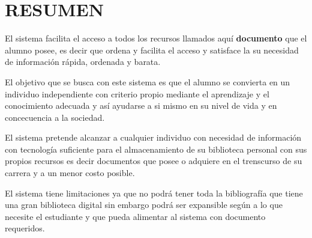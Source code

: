 \chapter*{RESUMEN}

El sistema facilita el acceso a todos los recursos llamados aquí  \textbf{documento} que el alumno posee, es decir que ordena y facilita el acceso y satisface la su necesidad de información rápida, ordenada y barata. 

El objetivo que se busca con este sistema es que el alumno se convierta en un individuo independiente con criterio propio mediante el aprendizaje y el conocimiento adecuada y así ayudarse a si mismo en su nivel de vida y en concecuencia a la sociedad. 

El sistema pretende alcanzar a cualquier individuo con necesidad de información con tecnología suficiente para el almacenamiento de su biblioteca personal con sus propios recursos es decir documentos que posee o adquiere en el trenscurso de su carrera y a un menor costo posible. 

El sistema tiene limitaciones ya que no podrá tener toda la bibliografía que tiene una gran biblioteca digital sin embargo podrá ser expansible según a lo que necesite el estudiante y que pueda alimentar al sistema con documento requeridos.